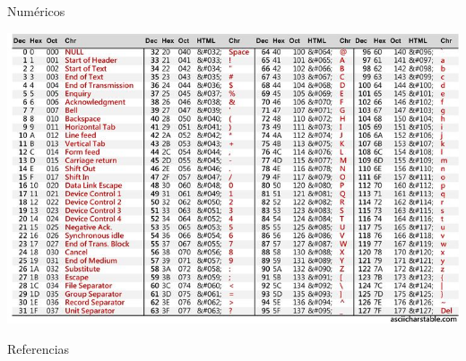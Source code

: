 \documentclass[aspectratio=169]{beamer}
\begin{document}
\begin{frame}{Numéricos}
    \begin{center}
        \includegraphics[width=0.93\linewidth]{fig/ASCII.jpg}
    \end{center}
\end{frame}

\begin{frame}{Referencias}


\footnotesize


\end{frame}
\end{document}
